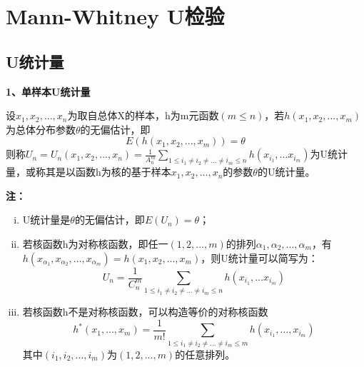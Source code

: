 \documentclass[lang=cn,10pt]{elegantbook}
\begin{document}
\section{Mann-Whitney U检验}
\subsection{U统计量}
\textbf{1、单样本U统计量}
\begin{definition}
    设$x_1,x_2,...,x_n$为取自总体X的样本，h为m元函数$(m\leq n)$，若$h(x_1,x_2,...,x_m)$为总体分布参数$\theta$的无偏估计，即
    \begin{equation}
        E(h(x_1,x_2,...,x_m))=\theta
    \end{equation}
    则称$U_n = U_n(x_1,x_2,...,x_n) = \frac1{A_n^m}\sum_{1\leq i_1\neq i_2\neq\ldots\neq i_m\leq n}h(x_{i_1},\ldots x_{i_m})$为U统计量，或称其是以函数h为核的基于样本$x_1,x_2,...,x_n$的参数$\theta$的U统计量。
\end{definition}
\textbf{注：}
\begin{enumerate}[(i)]
    \item U统计量是$\theta$的无偏估计，即$E(U_n) = \theta$；
    \item 若核函数h为对称核函数，即任一$(1,2,...,m)$的排列$\alpha_{1},\alpha_{2},...,\alpha_{m}$，有
    $h(x_{\alpha_1},x_{\alpha_2},...,x_{\alpha_m})=h(x_1,x_2,...,x_m)$，则U统计量可以简写为：
    \begin{equation}
        U_n = \frac1{C_n^m}\sum_{1\leq i_1\neq i_2\neq\ldots\neq i_m\leq n}h(x_{i_1},\ldots x_{i_m})
    \end{equation}
    \item 若核函数h不是对称核函数，可以构造等价的对称核函数
    \begin{equation}
        h^*(x_1,\ldots,x_m)=\frac1{m!}\sum_{1\leq i_1\neq i_2\neq\ldots\neq i_m\leq m}h(x_{i_1},\ldots,x_{i_m})
    \end{equation}
    其中$(i_1,i_2,...,i_m)$为$(1,2,...,m)$的任意排列。
\end{enumerate}
\end{document}
